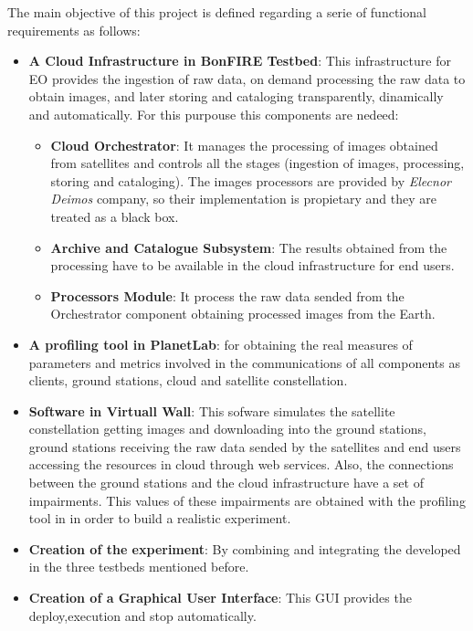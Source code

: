 The main objective of this project is defined regarding a serie of functional
requirements as follows:
\begin{itemize}
  
\item {\textbf{A Cloud Infrastructure in BonFIRE Testbed}: This
  infrastructure for \ac{EO} provides the ingestion of raw data, on demand processing the raw
  data to obtain images, and later storing and cataloging transparently,
  dinamically and automatically. For this purpouse this components are nedeed:
}
\begin{itemize}

\item{\textbf{Cloud Orchestrator}: It manages the
  processing of images obtained from satellites and controls all the stages
  (ingestion of images, processing, storing and cataloging). The images
  processors are provided by \emph{Elecnor Deimos} company, so their implementation is propietary and they are treated as a black box.}
\item {\textbf{Archive and Catalogue Subsystem}: The
  results obtained from the processing have to be available in the cloud
  infrastructure for end users.}
\item{\textbf{Processors Module}: It process the raw data sended from
  the Orchestrator component obtaining processed images from the Earth.}  
\end{itemize}
\item {\textbf{A profiling tool in PlanetLab}: for obtaining the real measures of
  parameters and metrics involved in the communications of all components as
  clients, ground stations, cloud and satellite constellation.}


\item {\textbf{Software in Virtuall Wall}: This sofware simulates the satellite
  constellation getting images and downloading into the ground stations, ground
  stations receiving the raw data sended by the satellites and end users
  accessing the resources in cloud through web services. Also, the connections
  between the ground stations and the cloud infrastructure have a set of
  impairments. This values of these impairments are obtained with the profiling tool in
  \pl in order to build a  realistic experiment.}

\item {\textbf{Creation of the experiment}: By combining and integrating
  the developed in the three testbeds mentioned before.}

\item {\textbf{Creation of a Graphical User Interface}: This \ac{GUI} provides
  the deploy,execution and stop automatically.} 


\end{itemize}

